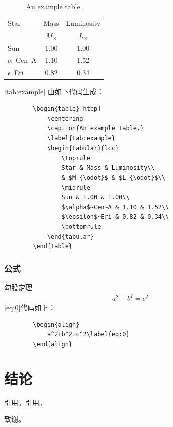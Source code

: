 \documentclass{YNUbachelor}
\begin{document}
	\begin{table}[htbp]
		\centering
		\caption{An example table.}
		\label{tab:example}
		\begin{tabular}{lcc}
			\toprule
			Star & Mass & Luminosity\\
			& $M_{\odot}$ & $L_{\odot}$\\
			\midrule
			Sun & 1.00 & 1.00\\
			$\alpha$~Cen~A & 1.10 & 1.52\\
			$\epsilon$~Eri & 0.82 & 0.34\\
			\bottomrule
		\end{tabular}
	\end{table}
	\autoref{tab:example} 由如下代码生成：
	\begin{verbatim}
		\begin{table}[htbp]
			\centering
			\caption{An example table.}
			\label{tab:example}
			\begin{tabular}{lcc}
				\toprule
				Star & Mass & Luminosity\\
				& $M_{\odot}$ & $L_{\odot}$\\
				\midrule
				Sun & 1.00 & 1.00\\
				$\alpha$~Cen~A & 1.10 & 1.52\\
				$\epsilon$~Eri & 0.82 & 0.34\\
				\bottomrule
			\end{tabular}
		\end{table}
	\end{verbatim}

	\subsubsection{公式}
	
	勾股定理
	\begin{align}
		a^2+b^2=c^2\label{eq:0}
	\end{align}
	\autoref{eq:0}代码如下：
	\begin{verbatim}
		\begin{align}
			a^2+b^2=c^2\label{eq:0}
		\end{align}
	\end{verbatim}
	
	\section{结论}
	引用\cite{向守平2008天体物理概论}。引用\cite{BQC_2020}。
	\begin{acknowledgement}
		致谢。
	\end{acknowledgement}

	\begin{reference}%
	\end{reference}
	
	\backcover%
\end{document}
